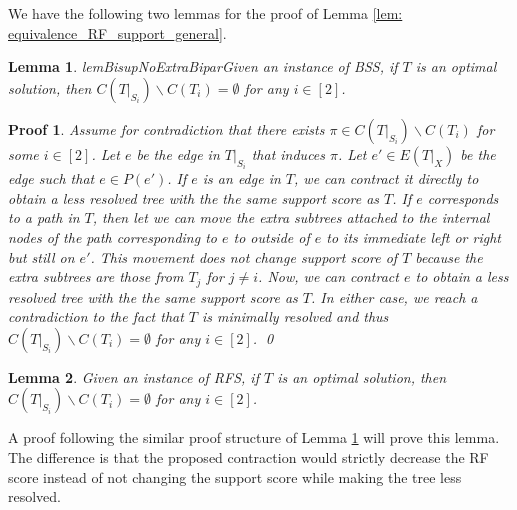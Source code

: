 \documentclass[twocolumn]{bmcart}%
\newcommand{\bss}{\textsc{BSS}\xspace}
\newcommand{\rfs}{\textsc{RFS}\xspace}
\theoremstyle{mystyle}
\newtheorem{lemma}{Lemma}
\theoremstyle{proofstyle}
\newtheorem*{proof2}{Proof}
\newenvironment{proofnospace}{\begin{proof2}}{\qed \end{proof2}}
\begin{document}
We have the following two lemmas for the proof of Lemma \ref{lem: equivalence_RF_support_general}.
\begin{lemma}{lemBisupNoExtraBipar}\label{lem:bisup_no_extra_bipar}
   Given an instance of \bss, if $T$ is an optimal solution, then $C(T|_{S_i})\backslash C(T_i) = \emptyset$ for any $i \in [2]$.
\end{lemma}
\begin{proofnospace}
    Assume for contradiction that there exists $\pi \in C(T|_{S_i})\backslash C(T_i)$ for some $i \in [2]$. Let $e$ be the edge in $T|_{S_i}$ that induces $\pi$. Let $e' \in E(T|_X)$ be the edge such that $e \in P(e')$.  If $e$ is an edge in $T$, we can contract it directly to obtain a less resolved tree with the the same support score as $T$. If $e$ corresponds to a path in $T$, then let we can move the extra subtrees attached to the internal nodes of the path corresponding to $e$ to outside of $e$ to its immediate left or right but still on $e'$. This movement does not change support score of $T$ because the extra subtrees are those from $T_j$ for $j \neq i$. Now, we can contract $e$ to obtain a less resolved tree with the the same support score as $T$. In either case, we reach a contradiction to the fact that $T$ is minimally resolved and thus $C(T|_{S_i})\backslash C(T_i) = \emptyset$ for any $i \in [2]$. 
\end{proofnospace}

\begin{lemma}\label{lem:RF_no_extra_bipar}
    Given an instance of \rfs, if $T$ is an optimal solution, then $C(T|_{S_i})\backslash C(T_i) = \emptyset$ for any $i \in [2]$.
\end{lemma}
A proof following the similar proof structure of Lemma \ref{lem:bisup_no_extra_bipar} will prove this lemma. The difference is that the proposed contraction would strictly decrease the RF score instead of not changing the support score while making the tree less resolved. 
\end{document}
